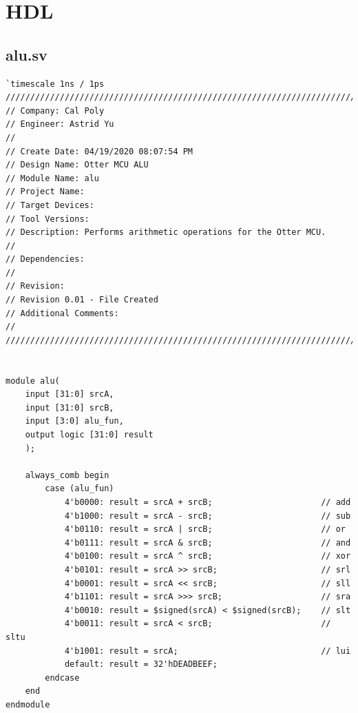 \documentclass{article}
\begin{document}
\section{HDL}

\subsection{alu.sv}
\begin{verbatim}
`timescale 1ns / 1ps
//////////////////////////////////////////////////////////////////////////////////
// Company: Cal Poly
// Engineer: Astrid Yu
// 
// Create Date: 04/19/2020 08:07:54 PM
// Design Name: Otter MCU ALU
// Module Name: alu
// Project Name: 
// Target Devices: 
// Tool Versions: 
// Description: Performs arithmetic operations for the Otter MCU.
// 
// Dependencies: 
// 
// Revision:
// Revision 0.01 - File Created
// Additional Comments:
// 
//////////////////////////////////////////////////////////////////////////////////


module alu(
    input [31:0] srcA,
    input [31:0] srcB,
    input [3:0] alu_fun,
    output logic [31:0] result
    );
        
    always_comb begin
        case (alu_fun)
            4'b0000: result = srcA + srcB;                      // add
            4'b1000: result = srcA - srcB;                      // sub
            4'b0110: result = srcA | srcB;                      // or
            4'b0111: result = srcA & srcB;                      // and
            4'b0100: result = srcA ^ srcB;                      // xor 
            4'b0101: result = srcA >> srcB;                     // srl
            4'b0001: result = srcA << srcB;                     // sll
            4'b1101: result = srcA >>> srcB;                    // sra
            4'b0010: result = $signed(srcA) < $signed(srcB);    // slt
            4'b0011: result = srcA < srcB;                      // sltu
            4'b1001: result = srcA;                             // lui
            default: result = 32'hDEADBEEF;
        endcase
    end
endmodule

\end{verbatim}
\end{document}
